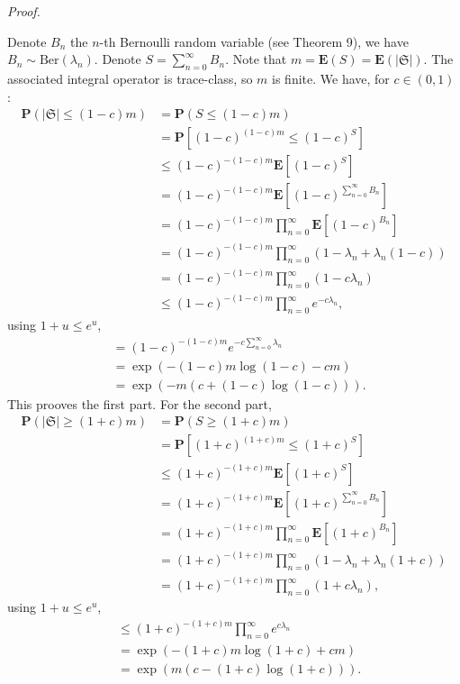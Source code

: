 \documentclass[11pt]{article}
\begin{document}
\textit{Proof.}

Denote $B_n$ the $n$-th Bernoulli random variable (see Theorem 9), we have $ B_n \sim \mathrm{Ber} (\lambda_n) $. Denote $ S=\sum\limits_{n=0}^\infty B_n$. Note that $m = \mathbf E(S) = \mathbf E(|\mathfrak S |) $. The associated integral operator is trace-class, so $m$ is finite. We have, for $ c \in (0,1) $ :
\begin{align*}
    \mathbf P( | \mathfrak S | \leqslant (1-c)m ) &= \mathbf P( S \leqslant (1-c)m ) \\
    &= \mathbf P\left[ (1-c)^{(1-c)m} \leqslant (1-c)^{S} \right] \\
    &\leqslant (1-c)^{-(1-c)m} \mathbf E[(1-c)^{S} ] \\
    &= (1-c)^{-(1-c)m} \mathbf E\left[ (1-c)^{\sum\limits_{n=0}^\infty B_n} \right] \\
    &= (1-c)^{-(1-c)m} \prod_{n=0}^\infty \mathbf E[ (1-c)^{B_n} ] \\
    &= (1-c)^{-(1-c)m} \prod_{n=0}^\infty (1-\lambda_n + \lambda_n(1-c)) \\
    &= (1-c)^{-(1-c)m} \prod_{n=0}^\infty (1-c\lambda_n) \\
    &\leqslant (1-c)^{-(1-c)m} \prod_{n=0}^\infty e^{-c\lambda_n},
\end{align*}
using $ 1+u \leqslant e^u $,
\begin{align*}
    &= (1-c)^{-(1-c)m} e^{-c \sum\limits_{n=0}^\infty \lambda_n} \\
    &= \exp(-(1-c)m \log(1-c) -c m) \\
    &= \exp(-m (c + (1-c) \log(1-c) )).
\end{align*}
This prooves the first part. For the second part,
\begin{align*}
    \mathbf P( | \mathfrak S | \geqslant (1+c)m ) &= \mathbf P( S \geqslant (1+c)m ) \\
    &= \mathbf P\left[ (1+c)^{(1+c)m} \leqslant (1+c)^{S} \right] \\
    &\leqslant (1+c)^{-(1+c)m} \mathbf E[(1+c)^{S} ] \\
    &= (1+c)^{-(1+c)m} \mathbf E\left[ (1+c)^{\sum\limits_{n=0}^\infty B_n} \right] \\
    &= (1+c)^{-(1+c)m} \prod_{n=0}^\infty \mathbf E[ (1+c)^{B_n} ] \\
    &= (1+c)^{-(1+c)m} \prod_{n=0}^\infty (1-\lambda_n + \lambda_n(1+c)) \\
    &= (1+c)^{-(1+c)m} \prod_{n=0}^\infty (1+c\lambda_n),
\end{align*}
using $ 1+u \leqslant e^u $,
\begin{align*}
    &\leqslant (1+c)^{-(1+c)m} \prod_{n=0}^\infty e^{c\lambda_n} \\
    &= \exp(-(1+c)m \log(1+c) +c m) \\
    &= \exp( m (c -(1+c) \log(1+c) )). \\
\end{align*}
\end{document}
